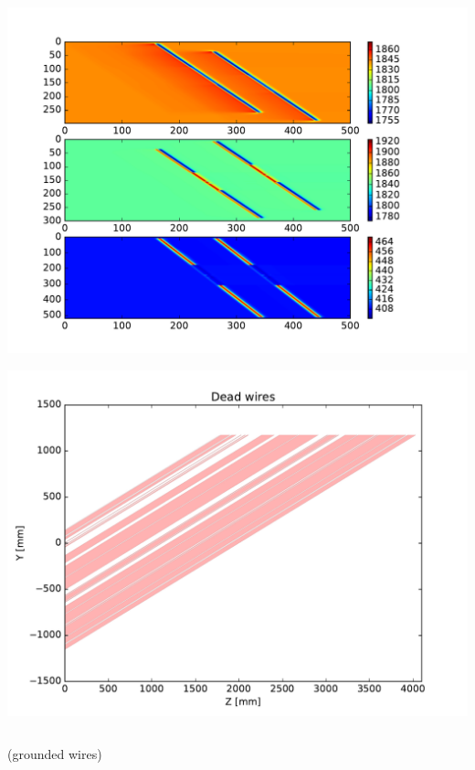 \documentclass[xcolor=dvipsnames]{beamer}
\begin{document}
\begin{frame}
\begin{columns}
\begin{column}{0.5\textwidth}
\begin{center}
        \includegraphics[height=0.6\textheight,clip,trim=15mm 1cm 0 1cm]{ideal-2tracks-uboone-vy-shorted-adc.pdf}

        \includegraphics[height=0.3\textheight,page=2,clip,trim=0 0 0 13.7mm]{microboone-shorted-wires-v2.pdf}
      \end{center}
    \end{column}
  \end{columns}

  \vspace{-20mm}

  \begin{center}
    \tiny (grounded wires)
  \end{center}
  

\end{frame}
\end{document}

